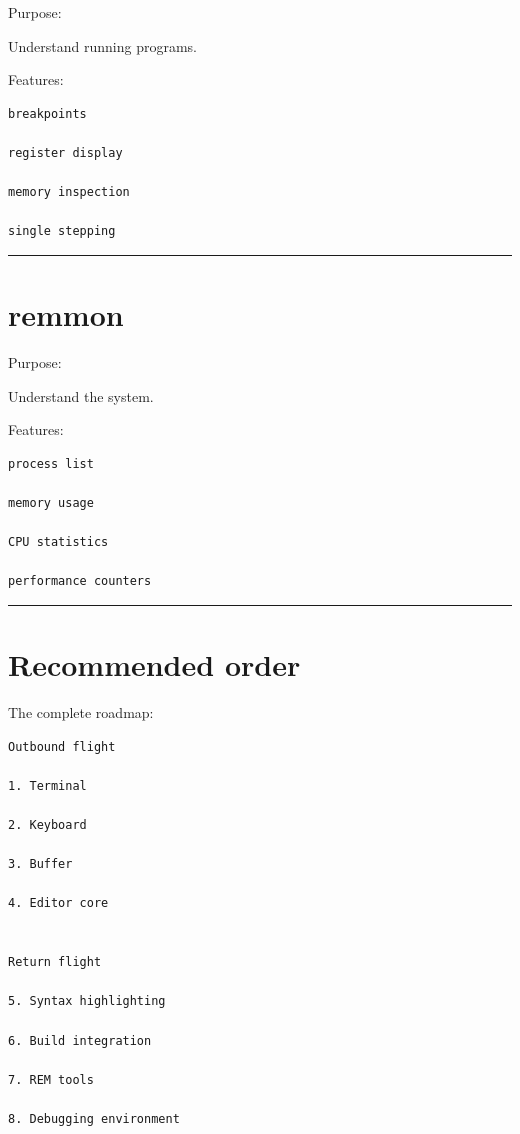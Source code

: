 \documentclass[
  oneside,
  openany]{book}
\begin{document}
Purpose:

Understand running programs.

Features:

\begin{verbatim}
breakpoints

register display

memory inspection

single stepping
\end{verbatim}

\begin{center}\rule{0.5\linewidth}{0.5pt}\end{center}

\hypertarget{remmon}{%
\section{remmon}\label{remmon}}

Purpose:

Understand the system.

Features:

\begin{verbatim}
process list

memory usage

CPU statistics

performance counters
\end{verbatim}

\begin{center}\rule{0.5\linewidth}{0.5pt}\end{center}

\hypertarget{recommended-order}{%
\section{Recommended order}\label{recommended-order}}

The complete roadmap:

\begin{verbatim}
Outbound flight

1. Terminal

2. Keyboard

3. Buffer

4. Editor core


Return flight

5. Syntax highlighting

6. Build integration

7. REM tools

8. Debugging environment
\end{verbatim}
\end{document}
